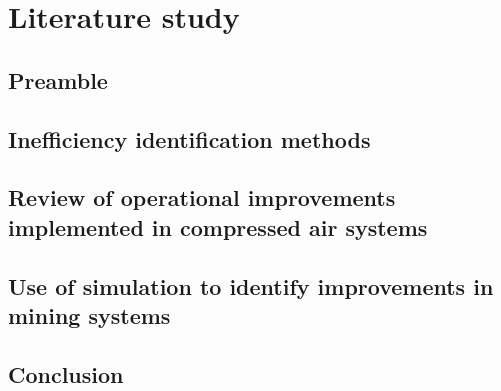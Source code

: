 \chapter{Literature study}
\section{Preamble}
\section{Inefficiency identification methods}
\section{Review of operational improvements implemented in compressed air systems}
\section{Use of simulation to identify improvements in mining systems}
\section{Conclusion}